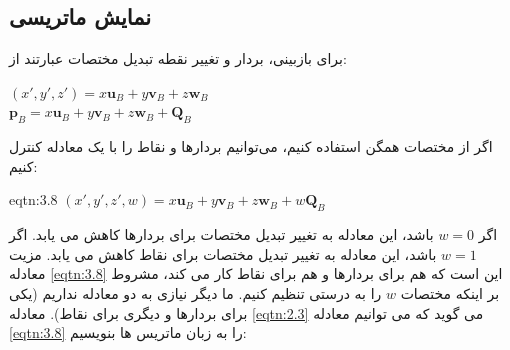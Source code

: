 \subsection{\textbf{نمایش ماتریسی}}
{
    \Large
    \begin{spacing}{1.5}
        برای بازبینی، بردار و تغییر نقطه تبدیل مختصات عبارتند از:

        \begin{flushleft}
            $(x\prime,y\prime,z\prime)=x\textbf{u}_{B}+y\textbf{v}_{B}+z\textbf{w}_{B}$ \\
            $\textbf{p}_{B}=x\textbf{u}_{B}+y\textbf{v}_{B}+z\textbf{w}_{B}+\textbf{Q}_{B}$ 
        \end{flushleft}

        اگر از مختصات همگن استفاده کنیم، می‌توانیم بردارها و نقاط را با یک معادله کنترل کنیم:

        \begin{eqtn}{eqtn:3.8}
            \centering
            $(x\prime,y\prime,z\prime,w)=x\textbf{u}_{B}+y\textbf{v}_{B}+z\textbf{w}_{B}+w\textbf{Q}_{B}$
        \end{eqtn}

        اگر $w=0$ باشد، این معادله به تغییر تبدیل مختصات برای بردارها کاهش می یابد.
        اگر $w=1$ باشد، این معادله به تغییر تبدیل مختصات برای نقاط کاهش می یابد.
        مزیت معادله \ref{eqtn:3.8} این است که هم برای بردارها و هم برای نقاط کار می کند، مشروط بر اینکه مختصات $w$ را به درستی تنظیم کنیم.
        ما دیگر نیازی به دو معادله نداریم (یکی برای بردارها و دیگری برای نقاط). معادله \ref{eqtn:2.3} می گوید که می توانیم معادله \ref{eqtn:3.8} را به زبان ماتریس ها بنویسیم:


\end{spacing}}
